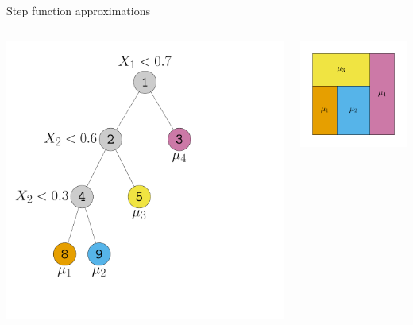 \documentclass[aspectratio=199]{beamer}
\begin{document}
\begin{frame}{Step function approximations}

\begin{columns}
\centering
\begin{column}{0.25\textwidth}
\centering
\includegraphics[width = \textwidth]{figures/old_decision_rule}
\end{column}
\begin{column}{0.15\textwidth}
\centering
\includegraphics[width = \textwidth]{figures/old_partition}

\end{column}
\end{columns}
\end{frame}
\end{document}

